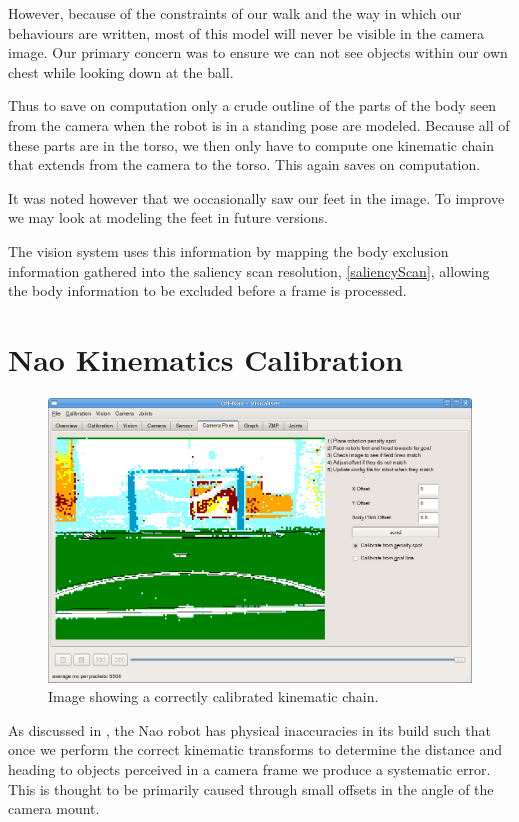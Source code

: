 \documentclass[pdftex,11pt,a4paper]{report}
\begin{document}
However, because of the constraints of our walk and the way in which our behaviours are written, most of this model will never be visible in the camera image. Our primary concern was to ensure we can not see objects within our own chest while looking down at the ball. 

Thus to save on computation only a crude outline of the parts of the body seen from the camera when the robot is in a standing pose are modeled. Because all of these parts are in the torso, we then only have to compute one kinematic chain that extends from the camera to the torso. This again saves on computation.

It was noted however that we occasionally saw our feet in the image. To improve we may look at modeling the feet in future versions.

The vision system uses this information by mapping the body exclusion information gathered into the saliency scan resolution, \autoref{saliencyScan}, allowing the body information to be excluded before a frame is processed.

\section{Nao Kinematics Calibration}
\label{kinematicCalibration}
\begin{figure}[ht]
\centering
\includegraphics[width=1.0\textwidth]{figures/kinematicsCalibration}
\caption{Image showing a correctly calibrated kinematic chain.} \label{figKinematicCalibration}
\end{figure}


As discussed in \cite{thomas09code}, the Nao robot has physical inaccuracies in
its build such that once we perform the correct kinematic transforms to
determine the distance and heading to objects perceived in a camera frame we
produce a systematic error. This is thought to be primarily caused through small
offsets in the angle of the camera mount. 
\end{document}
